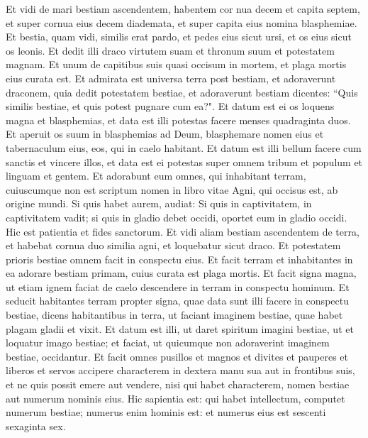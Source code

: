 \begin{biblechapter}  
\verse Et vidi de mari bestiam ascendentem, habentem cor nua decem et capita septem, et super cornua eius decem diademata, et super capita eius nomina blasphemiae. 
\verse Et bestia, quam vidi, similis erat pardo, et pedes eius sicut ursi, et os eius sicut os leonis. Et dedit illi draco virtutem suam et thronum suum et potestatem magnam. 
\verse Et unum de capitibus suis quasi occisum in mortem, et plaga mortis eius curata est. Et admirata est universa terra post bestiam, 
\verse et adoraverunt draconem, quia dedit potestatem bestiae, et adoraverunt bestiam dicentes: “Quis similis bestiae, et quis potest pugnare cum ea?". 
\verse Et datum est ei os loquens magna et blasphemias, et data est illi potestas facere menses quadraginta duos. 
\verse Et aperuit os suum in blasphemias ad Deum, blasphemare nomen eius et tabernaculum eius, eos, qui in caelo habitant. 
\verse Et datum est illi bellum facere cum sanctis et vincere illos, et data est ei potestas super omnem tribum et populum et linguam et gentem. 
\verse Et adorabunt eum omnes, qui inhabitant terram, cuiuscumque non est scriptum nomen in libro vitae Agni, qui occisus est, ab origine mundi. 
\verse Si quis habet aurem, audiat: 
\verse Si quis in captivitatem, in captivitatem vadit; si quis in gladio debet occidi, oportet eum in gladio occidi. Hic est patientia et fides sanctorum. 
\verse Et vidi aliam bestiam ascendentem de terra, et habebat cornua duo similia agni, et loquebatur sicut draco. 
\verse Et potestatem prioris bestiae omnem facit in conspectu eius. Et facit terram et inhabitantes in ea adorare bestiam primam, cuius curata est plaga mortis. 
\verse Et facit signa magna, ut etiam ignem faciat de caelo descendere in terram in conspectu hominum. 
\verse Et seducit habitantes terram propter signa, quae data sunt illi facere in conspectu bestiae, dicens habitantibus in terra, ut faciant imaginem bestiae, quae habet plagam gladii et vixit. 
\verse Et datum est illi, ut daret spiritum imagini bestiae, ut et loquatur imago bestiae; et faciat, ut quicumque non adoraverint imaginem bestiae, occidantur. 
\verse Et facit omnes pusillos et magnos et divites et pauperes et liberos et servos accipere characterem in dextera manu sua aut in frontibus suis, 
\verse et ne quis possit emere aut vendere, nisi qui habet characterem, nomen bestiae aut numerum nominis eius. 
\verse Hic sapientia est: qui habet intellectum, computet numerum bestiae; numerus enim hominis est: et numerus eius est sescenti sexaginta sex. 
\end{biblechapter}

